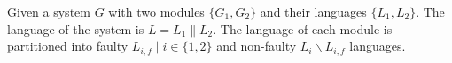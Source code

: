 \documentclass[a4paper, 10pt, conference]{ieeeconf}
\begin{document}
Given a system $G$ with two modules $\{G_1, G_2\}$ and
their languages $\{L_1, L_2\}$. The language of the system is $L = L_1 \parallel
L_2$. 
The language of each module is partitioned into faulty $L_{i,f}\mid i\in
\{1,2\}$ and non-faulty $L_i\backslash L_{i,f}$ languages.


% 
\end{document}
